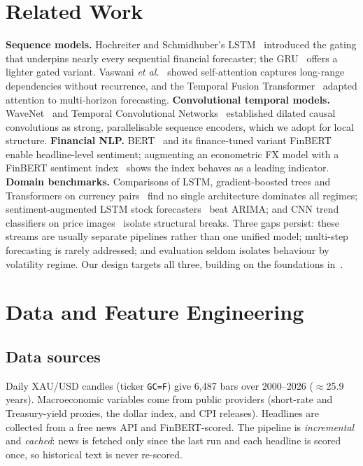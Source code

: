 \documentclass[conference]{IEEEtran}
\begin{document}
\section{Related Work}
\textbf{Sequence models.} Hochreiter and Schmidhuber's LSTM~\cite{lstm} introduced the
gating that underpins nearly every sequential financial forecaster; the GRU~\cite{gru}
offers a lighter gated variant. Vaswani \emph{et al.}~\cite{transformer} showed
self-attention captures long-range dependencies without recurrence, and the Temporal Fusion
Transformer~\cite{tft} adapted attention to multi-horizon forecasting.
\textbf{Convolutional temporal models.} WaveNet~\cite{wavenet} and Temporal Convolutional
Networks~\cite{tcn} established dilated causal convolutions as strong, parallelisable
sequence encoders, which we adopt for local structure.
\textbf{Financial NLP.} BERT~\cite{bert} and its finance-tuned variant FinBERT~\cite{finbert}
enable headline-level sentiment; augmenting an econometric FX model with a FinBERT sentiment
index~\cite{newsfx} shows the index behaves as a leading indicator.
\textbf{Domain benchmarks.} Comparisons of LSTM, gradient-boosted trees and Transformers on
currency pairs~\cite{forexlstm} find no single architecture dominates all regimes;
sentiment-augmented LSTM stock forecasters~\cite{seqdl} beat ARIMA; and CNN trend
classifiers on price images~\cite{cnnforex} isolate structural breaks. Three gaps persist:
these streams are usually separate pipelines rather than one unified model; multi-step
forecasting is rarely addressed; and evaluation seldom isolates behaviour by volatility
regime. Our design targets all three, building on the foundations in~\cite{goodfellow}.

\section{Data and Feature Engineering}
\subsection{Data sources}
Daily XAU/USD candles (ticker \texttt{GC=F}) give 6{,}487 bars over 2000--2026
($\approx$25.9 years). Macroeconomic variables come from public providers (short-rate and
Treasury-yield proxies, the dollar index, and CPI releases). Headlines are collected from a
free news API and FinBERT-scored. The pipeline is \emph{incremental} and \emph{cached}: news
is fetched only since the last run and each headline is scored once, so historical text is
never re-scored.
\end{document}
